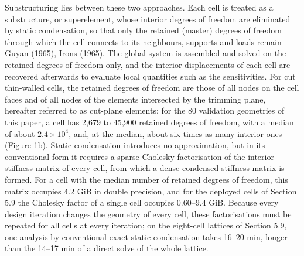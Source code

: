 \documentclass[preprint,12pt,authoryear]{elsarticle}
\begin{document}
Substructuring lies between these two approaches. Each cell is treated as a substructure, or superelement, whose interior degrees of freedom are eliminated by static condensation, so that only the retained (master) degrees of freedom through which the cell connects to its neighbours, supports and loads remain \href{https://doi.org/10.2514/3.2874}{Guyan (1965)}, \href{https://doi.org/10.2514/3.3027}{Irons (1965)}. The global system is assembled and solved on the retained degrees of freedom only, and the interior displacements of each cell are recovered afterwards to evaluate local quantities such as the sensitivities. For cut thin-walled cells, the retained degrees of freedom are those of all nodes on the cell faces and of all nodes of the elements intersected by the trimming plane, hereafter referred to as cut-plane elements; for the 80 validation geometries of this paper, a cell has 2,679 to 45,900 retained degrees of freedom, with a median of about \(2.4\times10^4\), and, at the median, about six times as many interior ones (Figure 1b). Static condensation introduces no approximation, but in its conventional form it requires a sparse Cholesky factorisation of the interior stiffness matrix of every cell, from which a dense condensed stiffness matrix is formed. For a cell with the median number of retained degrees of freedom, this matrix occupies 4.2 GiB in double precision, and for the deployed cells of Section 5.9 the Cholesky factor of a single cell occupies 0.60--9.4 GiB. Because every design iteration changes the geometry of every cell, these factorisations must be repeated for all cells at every iteration; on the eight-cell lattices of Section 5.9, one analysis by conventional exact static condensation takes 16--20 min, longer than the 14--17 min of a direct solve of the whole lattice.
\end{document}
